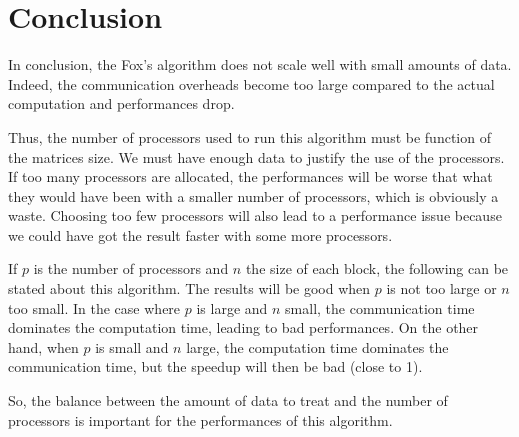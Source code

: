 \chapter{Conclusion}

In conclusion, the Fox's algorithm does not scale well with small amounts of data. Indeed, the communication overheads become too large compared to the actual computation and performances drop. 


Thus, the number of processors used to run this algorithm must be function of the matrices size. We must have enough data to justify the use of the processors. If too many processors are allocated, the performances will be worse that what they would have been with a smaller number of processors, which is obviously a waste. Choosing too few processors will also lead to a performance issue because we could have got the result faster with some more processors.


If $p$ is the number of processors and $n$ the size of each block, the following can be stated about this algorithm. The results will be good when $p$ is not too large or $n$ too small. In the case where $p$ is large and $n$ small, the communication time dominates the computation time, leading to bad performances. On the other hand, when $p$ is small and $n$ large, the computation time dominates the communication time, but the speedup will then be bad (close to 1). 


So, the balance between the amount of data to treat and the number of processors is important for the performances of this algorithm.

